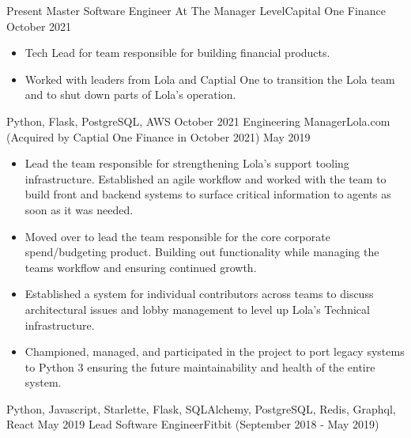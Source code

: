 %
%
%
\begin{experiences}
  \experience
  {Present}  {Master Software Engineer At The Manager Level}{Capital One Finance}
  {October 2021}   {
                      \begin{itemize}
                        \item Tech Lead for team responsible for building financial products.
                        \item Worked with leaders from Lola and Captial One to transition the Lola team and to shut down parts of Lola's operation. 
                      \end{itemize}
                  }
                  {Python, Flask, PostgreSQL, AWS}
  \emptySeparator
  \experience
  {October 2021}  {Engineering Manager}{Lola.com (Acquired by Captial One Finance in October 2021)}
  {May 2019}   {
                      \begin{itemize}
                        \item Lead the team responsible for strengthening Lola's support tooling infrastructure. Established an agile workflow and worked with the team to build front and backend systems to surface critical information to agents as soon as it was needed.
                        \item Moved over to lead the team responsible for the core corporate spend/budgeting product. Building out functionality while managing the teams workflow and ensuring continued growth.
                        \item Established a system for individual contributors across teams to discuss architectural issues and lobby management to level up Lola's Technical infrastructure. 
                        \item Championed, managed, and participated in the project to port legacy systems to Python 3 ensuring the future maintainability and health of the entire system.
                      \end{itemize}
                  }
                  {Python, Javascript, Starlette, Flask, SQLAlchemy, PostgreSQL, Redis, Graphql, React}
  \emptySeparator
  \experience
  {May 2019}  {Lead Software Engineer}{Fitbit {\footnotesize (September 2018 - May 2019)}}

\end{experiences}
